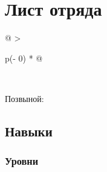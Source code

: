 \documentclass[
]{article}
\begin{document}
\section*{Лист
отряда}\label{ux43bux438ux441ux442-ux43eux442ux440ux44fux434ux430}

\begin{longtable}[]{@{}
  >{\raggedright\arraybackslash}p{(\columnwidth - 0\tabcolsep) * }@{}}
\toprule\noalign{}
\begin{minipage}[b]{\linewidth}\raggedright
\end{minipage} \\
\midrule\noalign{}
\endhead
\bottomrule\noalign{}
\endlastfoot
\end{longtable}

Позвыной:

\subsection*{Навыки}\label{ux43dux430ux432ux44bux43aux438}

\subsubsection*{Уровни}\label{ux443ux440ux43eux432ux43dux438}
\end{document}
